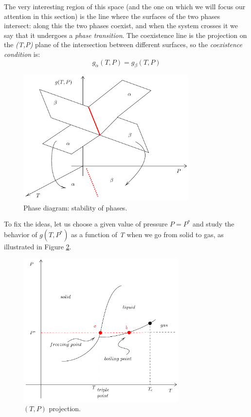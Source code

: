 \documentclass[../../Main/Main.tex]{subfiles}
\begin{document}
The very interesting region of this space (and the one on which we will focus our attention in this section) is the line where the surfaces of the two phases intersect: along this the two phases coexist, and when the system crosses it we say that it undergoes a \textit{phase transition}.
The coexistence line is the projection on the \emph{(T,P)} plane of the intersection between different surfaces, so the \textit{coexistence condition} is:
\begin{equation}
g_ \alpha(T,P) = g_ \beta(T,P)
  \label{eq:}
\end{equation}


\begin{figure}[h!]
\centering
\includegraphics[width=0.8\textwidth]{./img/1.pdf}
\caption{\label{fig:2_1} Phase diagram: stability of phases.}
\end{figure}



To fix the ideas, let us choose a given value of pressure \( P = P^* \) and study the behavior of \( g(T,P^*) \) as a function of \emph{T} when we go from solid to gas, as illustrated in Figure \ref{fig:2_2}.

\begin{figure}[h!]
\centering
\includegraphics[width=0.75\textwidth]{./img/2.pdf}
\caption{\label{fig:2_2} \( (T,P) \) projection.}
\end{figure}
\end{document}
